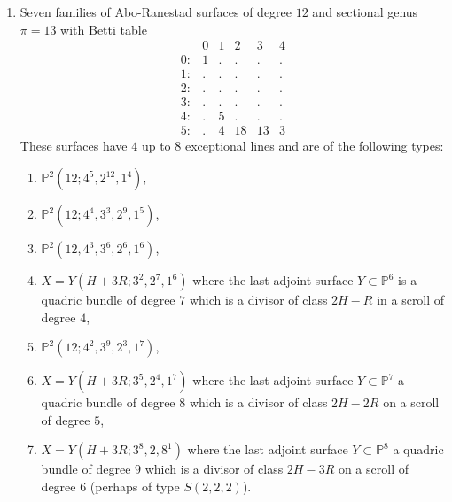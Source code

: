 \documentclass[twoside,12pt, leqno]{amsart}
\def\PP{{\mathbb P}}
\begin{document}
\begin{enumerate}
\item\label{ARsurf} Seven families of Abo-Ranestad surfaces of degree $12$ and sectional genus $\pi=13$ with Betti table
$$\begin{matrix}
       & 0 & 1 & 2 & 3 & 4\\
      0: & 1 & . & . & . & .\\
      1: & . & . & . & . & .\\
      2: & . & . & . & . & .\\
      3: & . & . & . & . & .\\
      4: & . & 5 & . & . & .\\
      5: & . & 4 & 18 & 13 & 3
      \end{matrix}$$
These surfaces have $4$ up to $8$ exceptional lines and are of the following types:
\begin{enumerate}
\item\label{ARsurfa}  $\PP^{2}(12;4^{5},2^{12},1^{4})$,
\item  $\PP^{2}(12;4^{4},3^{3},2^{9},1^{5})$,
\item $\PP^{2}(12,4^{3},3^{6},2^{6},1^{6})$,
 \item $X=Y(H+3R;3^{2},2^{7},1^{6})$ where the last adjoint surface $Y \subset \PP^{6}$ is a quadric bundle of degree $7$ which is a divisor of class $2H-R$ in a scroll of degree $4$, 
\item $\PP^{2}(12;4^{2},3^{9},2^{3},1^{7})$, 
\item  $X=Y(H+3R;3^{5},2^{4},1^{7})$ where the last adjoint surface $Y\subset \PP^{7}$ a quadric bundle of degree $8$ which is a divisor  of class $2H-2R$ on a scroll of degree $5$,
\item $X=Y(H+3R;3^{8},2,8^{1})$
where the last adjoint surface $Y \subset \PP^{8}$ a quadric bundle of degree $9$ which is  a divisor  of class $2H-3R$ on a scroll of degree $6$ (perhaps of type $S(2,2,2)$).
\end{enumerate}


\end{enumerate}
\end{document}
